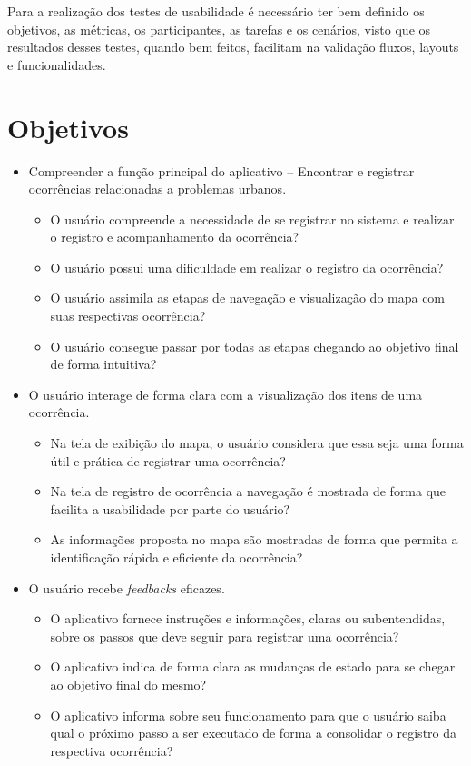 \documentclass[a4paper,12pt,twoside]{report}
\begin{document}
Para a realização dos testes de usabilidade é necessário ter bem definido os objetivos, as métricas, os participantes, as tarefas e os cenários, visto que os resultados desses testes, quando bem feitos, facilitam na validação fluxos, layouts e funcionalidades.\cite{R0,R4}

\section{Objetivos}
\begin{itemize}
\item Compreender a função principal do aplicativo – Encontrar e registrar ocorrências relacionadas a problemas urbanos.
\begin{itemize}
\item O usuário compreende a necessidade de se registrar no sistema e realizar o registro e acompanhamento da ocorrência?
\item O usuário possui uma dificuldade em realizar o registro da ocorrência?
\item O usuário assimila as etapas de navegação e visualização do mapa com suas respectivas ocorrência?
\item O usuário consegue passar por todas as etapas chegando ao objetivo final de forma intuitiva?
\end{itemize}
\item O usuário interage de forma clara com a visualização dos itens de uma ocorrência.
\begin{itemize}
\item Na tela de exibição do mapa, o usuário considera que essa seja uma forma útil e prática de registrar uma ocorrência?
\item Na tela de registro de ocorrência a navegação é mostrada de forma que facilita a usabilidade por parte do usuário?
\item As informações proposta no mapa são mostradas de forma que permita a identificação rápida e eficiente da ocorrência?
\end{itemize}
\item O usuário recebe \textit{feedbacks} eficazes.
\begin{itemize}
\item O aplicativo fornece instruções e informações, claras ou subentendidas, sobre os passos que deve seguir para registrar uma ocorrência?
\item O aplicativo indica de forma clara as mudanças de estado para se chegar ao objetivo final do mesmo?
\item O aplicativo informa sobre seu funcionamento para que o usuário saiba qual o próximo passo a ser executado de forma a consolidar o registro da respectiva ocorrência?
\end{itemize}
\end{itemize}
\end{document}
